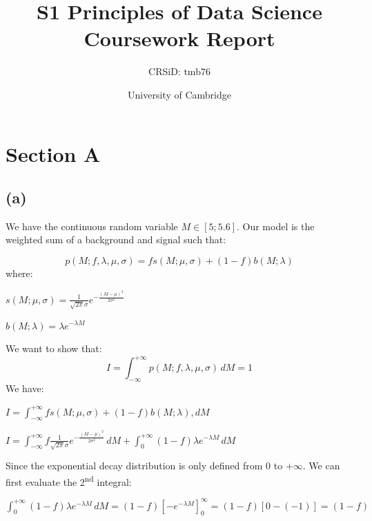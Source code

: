 \documentclass[12pt]{report} %
\title{S1 Principles of Data Science Coursework Report}
\author{CRSiD: tmb76}
\date{University of Cambridge}
\begin{document}
 

\maketitle

\section*{Section A}

\subsection*{(a)}

We have the continuous random variable $M \in{[5;5.6]}$. Our model is the weighted sum of a background and signal such that:  


\begin{equation}
p(M;f,\lambda,\mu,\sigma) = fs(M;\mu,\sigma) + (1 - f)b(M;\lambda)
\end{equation}
where:
\begin{center}
$s(M;\mu,\sigma) = \frac{1}{\sqrt{2\pi}\sigma} e^{-\frac{{(M - \mu)}^{2}}{2\sigma^{2}}}$
\end{center}
\begin{center}
$b(M;\lambda) = \lambda e^{-\lambda M}$
\end{center}
\vspace{1\baselineskip}  
We want to show that:  
\begin{equation}
I = \int_{-\infty}^{+\infty} p(M;f,\lambda,\mu,\sigma)\, dM = 1
\end{equation}
We have:  

\vspace{1\baselineskip}  
$I = \displaystyle\int_{-\infty}^{+\infty} fs(M;\mu,\sigma) + (1-f)b(M;\lambda), dM$  

$I = \displaystyle\int_{-\infty}^{+\infty} f\frac{1}{\sqrt{2\pi}\sigma} e^{-\frac{{(M - \mu)}^{2}}{2\sigma^{2}}}\, dM +  \displaystyle\int_{0}^{+\infty} (1-f)\lambda e^{-\lambda M}\, dM$  

\vspace*{1\baselineskip}
Since the exponential decay distribution is only defined from 0 to $+\infty$. We can first evaluate the 2\textsuperscript{nd} integral:  

\vspace*{1\baselineskip}
$\displaystyle \int_{0}^{+\infty} (1-f)\lambda e^{-\lambda M}\, dM  =  (1-f){[-e^{-\lambda M}]}_{0}^{\infty}  =  (1-f)[0 - (-1)]  =  (1-f)$  
\end{document}
